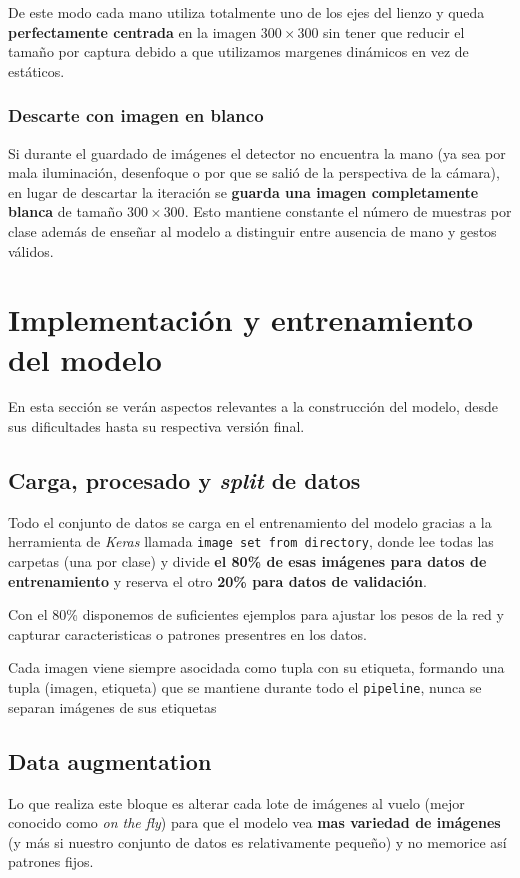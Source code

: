 De este modo cada mano utiliza totalmente uno de los ejes del lienzo y queda \textbf{perfectamente centrada} en la imagen $300\times300$ sin tener que reducir el tamaño por captura debido a que utilizamos margenes dinámicos en vez de estáticos.

\subsubsection{Descarte con imagen en blanco}
Si durante el guardado de imágenes el detector no encuentra la mano (ya sea por mala iluminación, desenfoque o por que se salió de la perspectiva de la cámara), en lugar de descartar la iteración se \textbf{guarda una imagen completamente blanca} de tamaño $300\times300$. Esto mantiene constante el número de muestras por clase además de enseñar al modelo a distinguir entre ausencia de mano y gestos válidos.






\section{Implementación y entrenamiento del modelo}
En esta sección se verán aspectos relevantes a la construcción del modelo, desde sus dificultades hasta su respectiva versión final.

\subsection{Carga, procesado y \textit{split} de datos}
Todo el conjunto de datos se carga en el entrenamiento del modelo gracias a la herramienta de \textit{Keras} llamada \texttt{image set from directory}, donde lee todas las carpetas (una por clase) y divide \textbf{el 80\% de esas imágenes para datos de entrenamiento} y reserva el otro \textbf{20\% para datos de validación}.

Con el 80\% disponemos de suficientes ejemplos para ajustar los pesos de la red y capturar caracteristicas o patrones presentres en los datos. 

Cada imagen viene siempre asocidada como tupla con su etiqueta, formando una tupla (imagen, etiqueta) que se mantiene durante todo el \texttt{pipeline}, nunca se separan imágenes de sus etiquetas

\subsection{Data augmentation}
Lo que realiza este bloque es alterar cada lote de imágenes al vuelo (mejor conocido como \textit{on the fly}) para que el modelo vea \textbf{mas variedad de imágenes} (y más si nuestro conjunto de datos es relativamente pequeño) y no memorice así patrones fijos.

